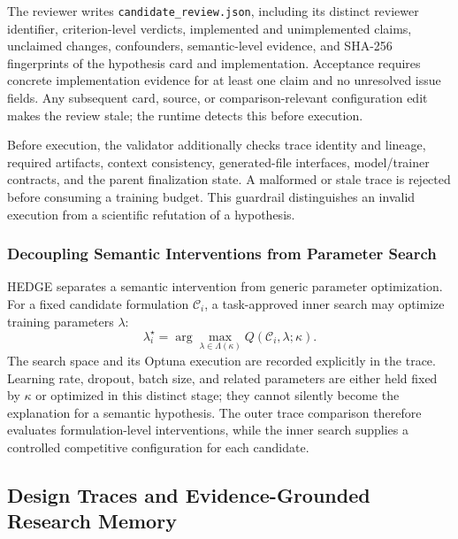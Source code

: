 The reviewer writes \texttt{candidate\_review.json}, including its distinct reviewer identifier, criterion-level verdicts, implemented and unimplemented claims, unclaimed changes, confounders, semantic-level evidence, and SHA-256 fingerprints of the hypothesis card and implementation. Acceptance requires concrete implementation evidence for at least one claim and no unresolved issue fields. Any subsequent card, source, or comparison-relevant configuration edit makes the review stale; the runtime detects this before execution.

Before execution, the validator additionally checks trace identity and lineage, required artifacts, context consistency, generated-file interfaces, model/trainer contracts, and the parent finalization state. A malformed or stale trace is rejected before consuming a training budget. This guardrail distinguishes an invalid execution from a scientific refutation of a hypothesis.

\subsubsection{Decoupling Semantic Interventions from Parameter Search}

HEDGE separates a semantic intervention from generic parameter optimization. For a fixed candidate formulation $\mathcal{C}_i$, a task-approved inner search may optimize training parameters $\lambda$:
\begin{equation}
    \lambda_i^{\star}=\arg\max_{\lambda\in\Lambda(\kappa)}
    Q(\mathcal{C}_i,\lambda;\kappa).
    \label{eq:param_search}
\end{equation}
The search space and its Optuna execution are recorded explicitly in the trace. Learning rate, dropout, batch size, and related parameters are either held fixed by $\kappa$ or optimized in this distinct stage; they cannot silently become the explanation for a semantic hypothesis. The outer trace comparison therefore evaluates formulation-level interventions, while the inner search supplies a controlled competitive configuration for each candidate.

\subsection{Design Traces and Evidence-Grounded Research Memory}
\label{sec:design_trace}

